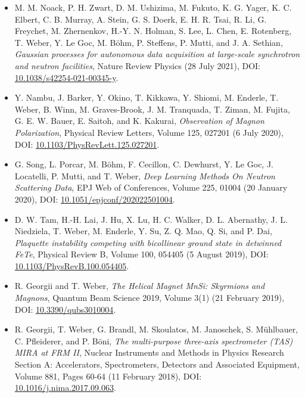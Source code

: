 \begin{itemize}
	\item M. M. Noack, P. H. Zwart, D. M. Ushizima, M. Fukuto, K. G. Yager, K. C. Elbert, 
		C. B. Murray, A. Stein, G. S. Doerk, E. H. R. Tsai, R. Li, G. Freychet, 
		M. Zhernenkov, H.-Y. N. Holman, S. Lee, L. Chen, E. Rotenberg, T. Weber, 
		Y. Le Goc, M. B\"ohm, P. Steffens, P. Mutti, and J. A. Sethian, 
	\textit{Gaussian processes for autonomous data acquisition at large-scale synchrotron and neutron facilities},
	Nature Review Physics (28 July 2021),
	DOI: \href{https://doi.org/10.1038/s42254-021-00345-y}{10.1038/s42254-021-00345-y}.

	\item Y. Nambu, J. Barker, Y. Okino, T. Kikkawa, Y. Shiomi, M. Enderle, T. Weber, B. Winn, M. Graves-Brook, J. M. Tranquada, T. Ziman, M. Fujita, G. E. W. Bauer, E. Saitoh, and K. Kakurai, 
	\textit{Observation of Magnon Polarization},
	Physical Review Letters, Volume 125, 027201 (6 July 2020),
	DOI: \href{https://doi.org/10.1103/PhysRevLett.125.027201}{10.1103/PhysRevLett.125.027201}.

	\item G. Song, L. Porcar, M. B\"ohm, F. Cecillon, C. Dewhurst, Y. Le Goc, J. Locatelli, P. Mutti, and T. Weber, 
	\textit{Deep Learning Methods On Neutron Scattering Data},
	EPJ Web of Conferences, Volume 225, 01004 (20 January 2020),
	DOI: \href{https://doi.org/10.1051/epjconf/202022501004}{10.1051/epjconf/202022501004}.

	\item D. W. Tam, H.-H. Lai, J. Hu, X. Lu, H. C. Walker, D. L. Abernathy, J. L. Niedziela, T. Weber, M. Enderle, Y. Su, Z. Q. Mao, Q. Si, and P. Dai,
	\textit{Plaquette instability competing with bicollinear ground state in detwinned FeTe},
	Physical Review B, Volume 100, 054405 (5 August 2019),
	DOI: \href{https://doi.org/10.1103/PhysRevB.100.054405}{10.1103/PhysRevB.100.054405}.
	
	\item R. Georgii and T. Weber,
	\textit{The Helical Magnet MnSi: Skyrmions and Magnons},
	Quantum Beam Science 2019, Volume 3(1) (21 February 2019),
	DOI: \href{https://doi.org/10.3390/qubs3010004}{10.3390/qubs3010004}.
	
	\item R. Georgii, T. Weber, G. Brandl, M. Skoulatos, M. Janoschek, S. Mühlbauer, C. Pfleiderer, and P. B\"oni,
	\textit{The multi-purpose three-axis spectrometer (TAS) MIRA at FRM II},
	Nuclear Instruments and Methods in Physics Research Section A: Accelerators, Spectrometers, Detectors and Associated Equipment, Volume 881, Pages 60-64 (11 February 2018),
	DOI: \href{https://doi.org/10.1016/j.nima.2017.09.063}{10.1016/j.nima.2017.09.063}.
\end{itemize}
